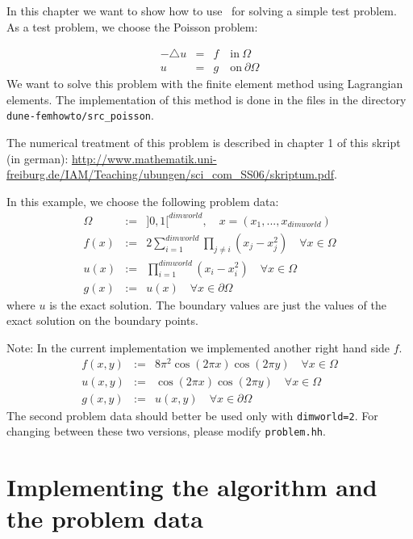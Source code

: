 %
%

In this chapter we want to show how to use \Fem\ for solving a simple test problem.
As a test problem, we choose the Poisson problem: \label{poissonproblem}

\begin{eqnarray}
  -\triangle u &=& f  \quad \mbox{in}\ \Omega\\
             u &=& g  \quad \mbox{on}\ \partial\Omega
\end{eqnarray}
We want to solve this problem with the finite element method using Lagrangian elements. The implementation of this method is done in the files in the directory \lstinline!dune-femhowto/src_poisson!.

The numerical treatment of this problem is described in chapter 1 of this skript (in german): \url{http://www.mathematik.uni-freiburg.de/IAM/Teaching/ubungen/sci_com_SS06/skriptum.pdf}.

In this example, we choose the following problem data:
\begin{eqnarray}
  \Omega &:=& ]0,1[^{dimworld}, \quad x = (x_1, ..., x_{dimworld}) \\
  f(x) &:=& 2 \sum_{i=1}^{dimworld} \prod_{j \neq i} (x_j-x_j^2)  \quad \forall x \in \Omega  \\
  u(x) &:=& \prod_{i=1}^{dimworld} (x_i - x_i^2)  \quad \forall x \in \Omega   \\
  g(x) &:=& u(x) \quad \forall x \in \partial\Omega
\end{eqnarray}
where $u$ is the exact solution. The boundary values are just the values of the exact solution on the boundary points.

Note: In the current implementation we implemented another right hand side $f$.
\begin{eqnarray}
  f(x,y) &:=& 8 \pi^2 \cos(2 \pi x) \cos(2 \pi y)  \quad \forall x \in \Omega  \\
  u(x,y) &:=&         \cos(2 \pi x) \cos(2 \pi y)  \quad \forall x \in \Omega   \\
  g(x,y) &:=& u(x,y) \quad \forall x \in \partial\Omega
\end{eqnarray}
The second problem data should better be used only with \texttt{dimworld=2}. For changing between these two versions, please modify \texttt{problem.hh}.



\section{Implementing the algorithm and the problem data}

